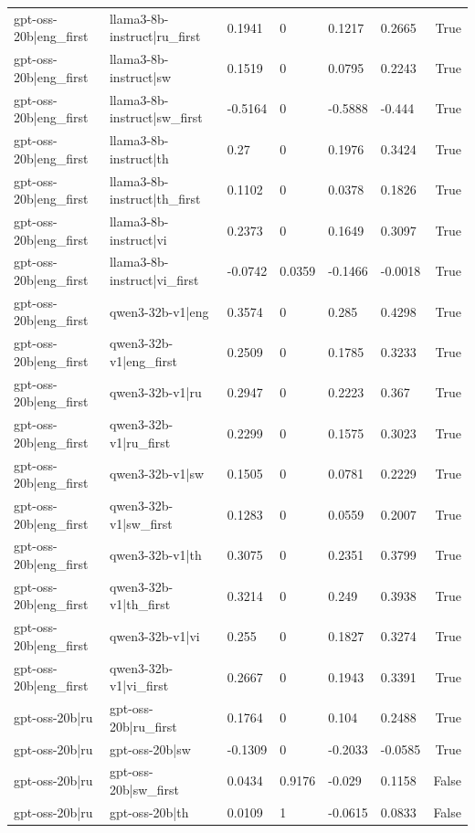 \begin{table}
\begin{tabular}{llllllr}
gpt-oss-20b|eng_first & llama3-8b-instruct|ru_first & 0.1941 & 0 & 0.1217 & 0.2665 & True \\
gpt-oss-20b|eng_first & llama3-8b-instruct|sw & 0.1519 & 0 & 0.0795 & 0.2243 & True \\
gpt-oss-20b|eng_first & llama3-8b-instruct|sw_first & -0.5164 & 0 & -0.5888 & -0.444 & True \\
gpt-oss-20b|eng_first & llama3-8b-instruct|th & 0.27 & 0 & 0.1976 & 0.3424 & True \\
gpt-oss-20b|eng_first & llama3-8b-instruct|th_first & 0.1102 & 0 & 0.0378 & 0.1826 & True \\
gpt-oss-20b|eng_first & llama3-8b-instruct|vi & 0.2373 & 0 & 0.1649 & 0.3097 & True \\
gpt-oss-20b|eng_first & llama3-8b-instruct|vi_first & -0.0742 & 0.0359 & -0.1466 & -0.0018 & True \\
gpt-oss-20b|eng_first & qwen3-32b-v1|eng & 0.3574 & 0 & 0.285 & 0.4298 & True \\
gpt-oss-20b|eng_first & qwen3-32b-v1|eng_first & 0.2509 & 0 & 0.1785 & 0.3233 & True \\
gpt-oss-20b|eng_first & qwen3-32b-v1|ru & 0.2947 & 0 & 0.2223 & 0.367 & True \\
gpt-oss-20b|eng_first & qwen3-32b-v1|ru_first & 0.2299 & 0 & 0.1575 & 0.3023 & True \\
gpt-oss-20b|eng_first & qwen3-32b-v1|sw & 0.1505 & 0 & 0.0781 & 0.2229 & True \\
gpt-oss-20b|eng_first & qwen3-32b-v1|sw_first & 0.1283 & 0 & 0.0559 & 0.2007 & True \\
gpt-oss-20b|eng_first & qwen3-32b-v1|th & 0.3075 & 0 & 0.2351 & 0.3799 & True \\
gpt-oss-20b|eng_first & qwen3-32b-v1|th_first & 0.3214 & 0 & 0.249 & 0.3938 & True \\
gpt-oss-20b|eng_first & qwen3-32b-v1|vi & 0.255 & 0 & 0.1827 & 0.3274 & True \\
gpt-oss-20b|eng_first & qwen3-32b-v1|vi_first & 0.2667 & 0 & 0.1943 & 0.3391 & True \\
gpt-oss-20b|ru & gpt-oss-20b|ru_first & 0.1764 & 0 & 0.104 & 0.2488 & True \\
gpt-oss-20b|ru & gpt-oss-20b|sw & -0.1309 & 0 & -0.2033 & -0.0585 & True \\
gpt-oss-20b|ru & gpt-oss-20b|sw_first & 0.0434 & 0.9176 & -0.029 & 0.1158 & False \\
gpt-oss-20b|ru & gpt-oss-20b|th & 0.0109 & 1 & -0.0615 & 0.0833 & False \\

\end{tabular}
\end{table}
